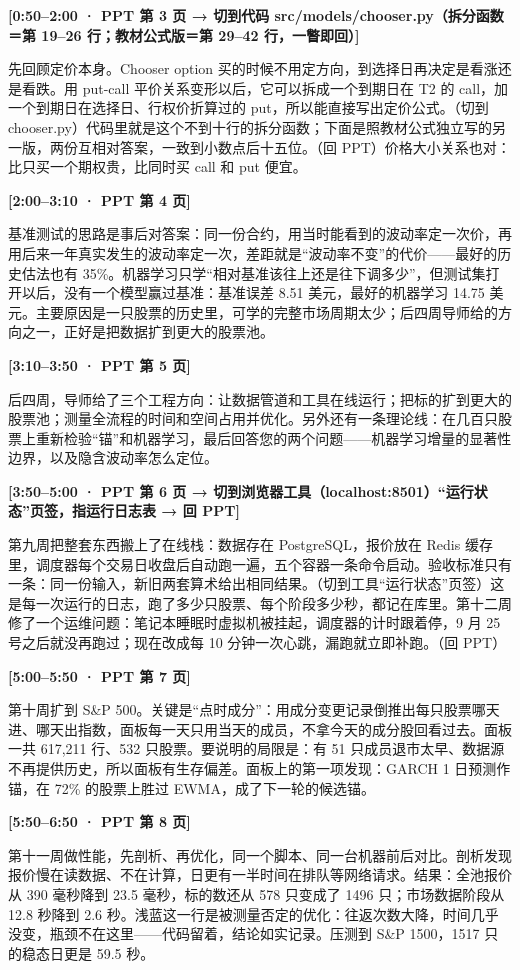 \documentclass[11pt]{ctexart}
\newcommand{\cue}[1]{\noindent\colorbox{gray!15}{\parbox{\dimexpr\linewidth-2\fboxsep}{\textbf{#1}}}\par\smallskip}
\begin{document}
\cue{[0:50--2:00 · PPT 第 3 页 → 切到代码 src/models/chooser.py（拆分函数＝第 19--26 行；教材公式版＝第 29--42 行，一瞥即回）]}
先回顾定价本身。Chooser option 买的时候不用定方向，到选择日再决定是看涨还是看跌。用 put-call 平价关系变形以后，它可以拆成一个到期日在 T2 的 call，加一个到期日在选择日、行权价折算过的 put，所以能直接写出定价公式。（切到 chooser.py）代码里就是这个不到十行的拆分函数；下面是照教材公式独立写的另一版，两份互相对答案，一致到小数点后十五位。（回 PPT）价格大小关系也对：比只买一个期权贵，比同时买 call 和 put 便宜。

\cue{[2:00--3:10 · PPT 第 4 页]}
基准测试的思路是事后对答案：同一份合约，用当时能看到的波动率定一次价，再用后来一年真实发生的波动率定一次，差距就是“波动率不变”的代价——最好的历史估法也有 35\%。机器学习只学“相对基准该往上还是往下调多少”，但测试集打开以后，没有一个模型赢过基准：基准误差 8.51 美元，最好的机器学习 14.75 美元。主要原因是一只股票的历史里，可学的完整市场周期太少；后四周导师给的方向之一，正好是把数据扩到更大的股票池。

\cue{[3:10--3:50 · PPT 第 5 页]}
后四周，导师给了三个工程方向：让数据管道和工具在线运行；把标的扩到更大的股票池；测量全流程的时间和空间占用并优化。另外还有一条理论线：在几百只股票上重新检验“锚”和机器学习，最后回答您的两个问题——机器学习增量的显著性边界，以及隐含波动率怎么定位。

\cue{[3:50--5:00 · PPT 第 6 页 → 切到浏览器工具（localhost:8501）“运行状态”页签，指运行日志表 → 回 PPT]}
第九周把整套东西搬上了在线栈：数据存在 PostgreSQL，报价放在 Redis 缓存里，调度器每个交易日收盘后自动跑一遍，五个容器一条命令启动。验收标准只有一条：同一份输入，新旧两套算术给出相同结果。（切到工具“运行状态”页签）这是每一次运行的日志，跑了多少只股票、每个阶段多少秒，都记在库里。第十二周修了一个运维问题：笔记本睡眠时虚拟机被挂起，调度器的计时跟着停，9 月 25 号之后就没再跑过；现在改成每 10 分钟一次心跳，漏跑就立即补跑。（回 PPT）

\cue{[5:00--5:50 · PPT 第 7 页]}
第十周扩到 S\&P 500。关键是“点时成分”：用成分变更记录倒推出每只股票哪天进、哪天出指数，面板每一天只用当天的成员，不拿今天的成分股回看过去。面板一共 617,211 行、532 只股票。要说明的局限是：有 51 只成员退市太早、数据源不再提供历史，所以面板有生存偏差。面板上的第一项发现：GARCH 1 日预测作锚，在 72\% 的股票上胜过 EWMA，成了下一轮的候选锚。

\cue{[5:50--6:50 · PPT 第 8 页]}
第十一周做性能，先剖析、再优化，同一个脚本、同一台机器前后对比。剖析发现报价慢在读数据、不在计算，日更有一半时间在排队等网络请求。结果：全池报价从 390 毫秒降到 23.5 毫秒，标的数还从 578 只变成了 1496 只；市场数据阶段从 12.8 秒降到 2.6 秒。浅蓝这一行是被测量否定的优化：往返次数大降，时间几乎没变，瓶颈不在这里——代码留着，结论如实记录。压测到 S\&P 1500，1517 只的稳态日更是 59.5 秒。
\end{document}
